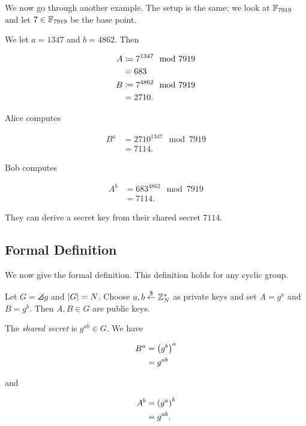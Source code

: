 \begin{example}[DH Example 2]

We now go through another example.
The setup is the same:
we look at $\mathbb{F}_{7919}$ and let $7\in\mathbb{F}_{7919}$ be the base point.

We let $a = 1347$ and $b = 4862$.
Then

\begin{align}
    A &\coloneqq{} 7^{1347} \mod 7919 \nonumber\\
        &= 683 \nonumber\\
    B &\coloneqq{} 7^{4862} \mod 7919 \nonumber\\
        &= 2710.
\end{align}

Alice computes

\begin{align}
    B^{a} &= 2710^{1347} \mod 7919 \nonumber\\
        &= 7114.
\end{align}

\noindent
Bob computes

\begin{align}
    A^{b} &= 683^{4862} \mod 7919 \nonumber\\
        &= 7114.
\end{align}

\noindent
They can derive a secret key from their \gls{shared secret} $7114$.
\end{example}

\subsection{Formal Definition}

We now give the formal definition.
This definition holds for any \gls{cyclic group}.

\begin{defn}
\label{def:diffie-hellman}
Let $G = \angles{g}$ and $\left| G \right| = N$.
Choose $a,b\stackrel{\$}{\leftarrow}{}\mathbb{Z}_{N}^{*}$ as private keys and set
$A = g^{a}$ and $B = g^{b}$.
Then $A,B\in G$ are public keys.

The \emph{\gls{shared secret}} is $g^{ab}\in G$.
We have

\begin{align}
    B^{a} &= \left( g^{b} \right)^{a} \nonumber\\
        &= g^{ab}
\end{align}

\noindent
and

\begin{align}
    A^{b} &= \left( g^{a} \right)^{b} \nonumber\\
        &= g^{ab}.
\end{align}
\end{defn}

